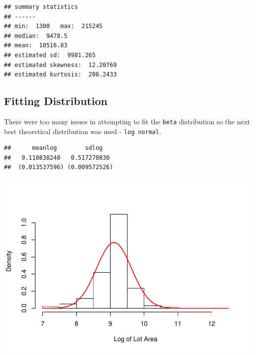 \documentclass[]{article}
\newenvironment{Shaded}{\begin{snugshade}}{\end{snugshade}}
\newcommand{\KeywordTok}[1]{\textcolor[rgb]{0.13,0.29,0.53}{\textbf{{#1}}}}
\newcommand{\DataTypeTok}[1]{\textcolor[rgb]{0.13,0.29,0.53}{{#1}}}
\newcommand{\DecValTok}[1]{\textcolor[rgb]{0.00,0.00,0.81}{{#1}}}
\newcommand{\StringTok}[1]{\textcolor[rgb]{0.31,0.60,0.02}{{#1}}}
\newcommand{\OtherTok}[1]{\textcolor[rgb]{0.56,0.35,0.01}{{#1}}}
\newcommand{\NormalTok}[1]{{#1}}
\begin{document}
\begin{verbatim}
## summary statistics
## ------
## min:  1300   max:  215245 
## median:  9478.5 
## mean:  10516.83 
## estimated sd:  9981.265 
## estimated skewness:  12.20769 
## estimated kurtosis:  206.2433
\end{verbatim}

\newpage

\subsection{Fitting Distribution}\label{fitting-distribution}

There were too many issues in attempting to fit the \texttt{beta}
distribution so the next best theoretical distribution was used -
\texttt{log\ normal}.

\begin{Shaded}
\end{Shaded}

\begin{verbatim}
##      meanlog        sdlog   
##   9.110838240   0.517270830 
##  (0.013537596) (0.009572526)
\end{verbatim}

\begin{Shaded}
\end{Shaded}

\includegraphics{Final_Project_files/figure-latex/unnamed-chunk-16-1.pdf}
\end{document}
